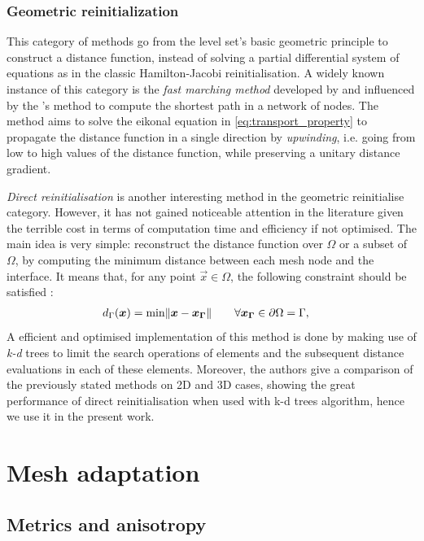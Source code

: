 \subsubsection{Geometric reinitialization}
%
This category of methods go from the level set's basic geometric principle to construct a distance function,
instead of solving a partial differential system of equations as in the classic Hamilton-Jacobi reinitialisation.
A widely known instance of this category is the \emph{fast marching method} developed by \citet{sethian_fast_1996}
and influenced by the \citet{dijkstra_note_1959}'s method to compute the shortest path in a network of nodes. 
The method aims to solve the eikonal equation in \cref{eq:transport_property} to propagate the distance function in a 
single direction by \emph{upwinding}, i.e. going from low to high values of the distance function, 
while preserving a unitary distance gradient.

\emph{Direct reinitialisation} is another interesting method in the geometric reinitialise category. However,
it has not gained noticeable attention in the literature given the terrible cost in terms of computation time and efficiency if not optimised.
The main idea is very simple: reconstruct the distance function over $\Omega$ or a subset of $\Omega$, by computing the 
minimum distance between each mesh node and the interface. It means that, for any point $\vec{x} \in \Omega$, the following 
constraint should be satisfied \citet{osher_signed_2003}:
\begin{align}
\label{eq:min_distance}
& d_\Gamma(\boldsymbol{x}) = \min \lVert \boldsymbol{x}-\boldsymbol{x_\Gamma} \rVert \qquad \forall \boldsymbol{x_\Gamma} \in \partial \Omega = \Gamma,
\end{align}
A efficient and optimised implementation of this method is done by \citet{shakoor_efficient_2015} making use of \emph{k-d} trees
to limit the search operations of elements and the subsequent distance evaluations in each of these elements.
Moreover, the authors give a comparison of the previously stated methods on 2D and 3D cases, showing the great 
performance of direct reinitialisation when used with k-d trees algorithm, hence we use it in the present work.
%
\section{Mesh adaptation}

\subsection{Metrics and anisotropy}

